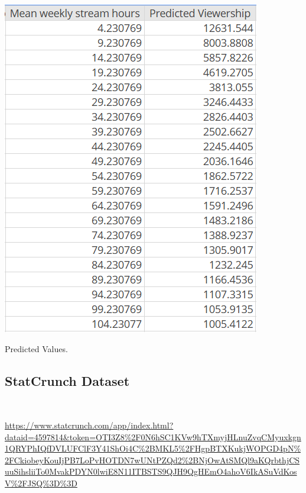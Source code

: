 \documentclass[12pt]{article}
\begin{document}
\begin{table}[H]
  \centering
  \includegraphics[scale=1]{../StatCrunch_Results/reciprocal/prediction_matrix}
  \captionsetup{justification=centering, singlelinecheck=false, margin=2cm}
  \caption[Prediction Matrix]{Predicted Values.}
  \label{tab:prediction_matrix}
\end{table}

\subsection{StatCrunch Dataset}\

\begin{tiny}
\url{https://www.statcrunch.com/app/index.html?dataid=4597814&token=OTI3Z8\%2F0N6hSC1KVw9hTXmyjHLnuZvqCMyuxkgn1QRYPhIQfDVLUFClF3Y41ShOi4C\%2BMKL5\%2FHgpBTXKukjWOPGD4pN\%2FCkiobeyKouIjPB7LoPvHOTDN7wUNtPZQd2\%2BNjOwAtSMQl9aKQrbthjCSuuSihsliiTo0MvakPDYN0lwiE8N11ITBSTS9QJH9QgHEmO4ahoV6IkASuVdKosV\%2FJSQ\%3D\%3D}
\end{tiny}

\end{document}

